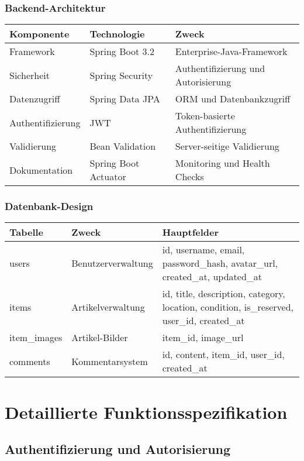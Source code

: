 \documentclass[a4paper,12pt]{article}
\begin{document}
\subsubsection{Backend-Architektur}
\begin{longtable}{|p{}|p{}|p{}|}
\hline
\textbf{Komponente} & \textbf{Technologie} & \textbf{Zweck} \\
\hline
Framework & Spring Boot 3.2 & Enterprise-Java-Framework \\
\hline
Sicherheit & Spring Security & Authentifizierung und Autorisierung \\
\hline
Datenzugriff & Spring Data JPA & ORM und Datenbankzugriff \\
\hline
Authentifizierung & JWT & Token-basierte Authentifizierung \\
\hline
Validierung & Bean Validation & Server-seitige Validierung \\
\hline
Dokumentation & Spring Boot Actuator & Monitoring und Health Checks \\
\hline
\end{longtable}

\subsubsection{Datenbank-Design}
\begin{longtable}{|p{}|p{}|p{}|}
\hline
\textbf{Tabelle} & \textbf{Zweck} & \textbf{Hauptfelder} \\
\hline
users & Benutzerverwaltung & id, username, email, password\_hash, avatar\_url, created\_at, updated\_at \\
\hline
items & Artikelverwaltung & id, title, description, category, location, condition, is\_reserved, user\_id, created\_at \\
\hline
item\_images & Artikel-Bilder & item\_id, image\_url \\
\hline
comments & Kommentarsystem & id, content, item\_id, user\_id, created\_at \\
\hline
\end{longtable}

\section{Detaillierte Funktionsspezifikation}

\subsection{Authentifizierung und Autorisierung}
\end{document}

